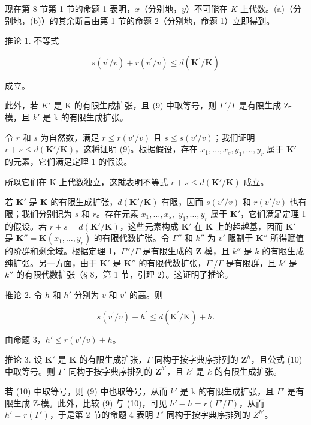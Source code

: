 现在第 8 节第 1 节的命题 1 表明，\(x\)（分别地，\(y\)）不可能在 \(K\) 上代数。(a)（分别地，(b)）的其余断言由第 1 节的命题 2（分别地，命题 1）立即得到。

推论 1. 不等式

\[
s (v ^ {\prime} / v) + r (v ^ {\prime} / v) \leqslant d (\mathbf {K} ^ {\prime} / \mathbf {K})\tag{9}
\]

成立。

此外，若 \(K'\) 是 K 的有限生成扩张，且 (9) 中取等号，则 \(\Gamma'/\Gamma\) 是有限生成 Z-模，且 \(k'\) 是 k 的有限生成扩张。

令 \(r\) 和 \(s\) 为自然数，满足 \(r \leqslant r(v'/v)\) 且 \(s \leqslant s(v'/v)\)；我们证明 \(r + s \leqslant d(\mathbf{K}'/\mathbf{K})\)，这将证明 (9)。根据假设，存在 \(x_1, \ldots, x_s, y_1, \ldots, y_r\) 属于 \(\mathbf{K}'\) 的元素，它们满足定理 1 的假设。

所以它们在 K 上代数独立，这就表明不等式 \(r + s \leqslant d(\mathbf{K}'/\mathbf{K})\) 成立。

若 \(\mathbf{K}'\) 是 \(\mathbf{K}\) 的有限生成扩张，\(d(\mathbf{K}' / \mathbf{K})\) 有限，因而 \(s(v' / v)\) 和 \(r(v' / v)\) 也有限；我们分别记为 \(s\) 和 \(r\)。存在元素 \(x_{1},\ldots ,x_{s},\) \(y_{1},\ldots ,y_{r}\) 属于 \(\mathbf{K}'\)，它们满足定理 1 的假设。若 \(r + s = d(\mathbf{K}' / \mathbf{K})\)，这些元素构成 \(\mathbf{K}'\) 在 \(\mathbf{K}\) 上的超越基，因而 \(\mathbf{K}'\) 是 \(\mathbf{K}'' = \mathbf{K}(x_1,\dots,y_r)\) 的有限代数扩张。令 \(\Gamma''\) 和 \(k''\) 为 \(v'\) 限制于 \(\mathbf{K}''\) 所得赋值的阶群和剩余域。根据定理 1，\(\Gamma'' / \Gamma\) 是有限生成的 \(\mathbf{Z}\)-模，且 \(k''\) 是 \(k\) 的有限生成纯扩张。另一方面，由于 \(\mathbf{K}'\) 是 \(\mathbf{K}''\) 的有限代数扩张，\(\Gamma' / \Gamma\) 是有限群，且 \(k'\) 是 \(k''\) 的有限代数扩张（§ 8，第 1 节，引理 2）。这证明了推论。

推论 2. 令 \(h\) 和 \(h'\) 分别为 \(v\) 和 \(v'\) 的高。则

\[
s (v ^ {\prime} / v) + h ^ {\prime} \leqslant d (\mathrm{K} ^ {\prime} / \mathrm{K}) + h.\tag{10}
\]

由命题 3，\(h' \leqslant r(v'/v) + h\)。

推论 3. 设 \(\mathbf{K}'\) 是 \(\mathbf{K}\) 的有限生成扩张，\(\Gamma\) 同构于按字典序排列的 \(\mathbf{Z}^h\)，且公式 (10) 中取等号。则 \(\Gamma'\) 同构于按字典序排列的 \(\mathbf{Z}^{h'}\)，且 \(k'\) 是 \(k\) 的有限生成扩张。

若 (10) 中取等号，则 (9) 中也取等号，从而 \(k'\) 是 k 的有限生成扩张，且 \(\Gamma'\) 是有限生成 Z-模。此外，比较 (9) 与 (10)，可见 \(h' - h = r(\Gamma'/\Gamma)\)，从而 \(h' = r(\Gamma')\)，于是第 2 节的命题 4 表明 \(\Gamma'\) 同构于按字典序排列的 \(Z^{h'}\)。

